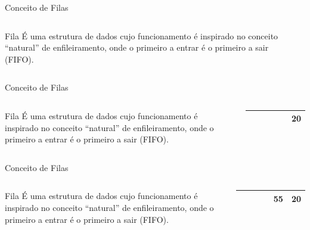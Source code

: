\documentclass[12pt,table,xcolor={dvipsnames}]{beamer}
\begin{document}
\begin{frame}{Conceito de Filas}
\begin{columns}
\begin{block}{Fila}
É uma estrutura de dados cujo funcionamento é inspirado no conceito “natural” de enfileiramento, onde o primeiro a entrar é o primeiro a sair (FIFO).
\end{block}
\begin{center}
{
\begin{tabular}{ |p{.5cm}|p{.5cm}|p{.5cm}|p{.5cm}|p{.5cm}|p{.5cm}| }
\hline
 & & & & &\\ \hline
\end{tabular}
}
\end{center}
\end{columns}
\end{frame}

\begin{frame}{Conceito de Filas}
\begin{columns}
\begin{block}{Fila}
É uma estrutura de dados cujo funcionamento é inspirado no conceito “natural” de enfileiramento, onde o primeiro a entrar é o primeiro a sair (FIFO).
\end{block}
\begin{center}
{
\begin{tabular}{ |p{.5cm}|p{.5cm}|p{.5cm}|p{.5cm}|p{.5cm}|p{.5cm}| }
\hline
 &  &  &  &  & 20 \\ \hline
\end{tabular}
}
\end{center}
\end{columns}
\end{frame}

\begin{frame}{Conceito de Filas}
\begin{columns}
\begin{block}{Fila}
É uma estrutura de dados cujo funcionamento é inspirado no conceito “natural” de enfileiramento, onde o primeiro a entrar é o primeiro a sair (FIFO).
\end{block}
\begin{center}
{
\begin{tabular}{ |p{.5cm}|p{.5cm}|p{.5cm}|p{.5cm}|p{.5cm}|p{.5cm}| }
\hline
 &  &  &  & 55 & 20 \\ \hline
\end{tabular}
}
\end{center}
\end{columns}
\end{frame}
\end{document}
